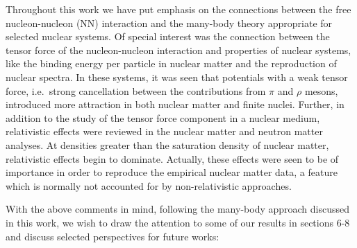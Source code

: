 
Throughout this work we have put emphasis on the connections between the
free nucleon-nucleon (NN) interaction and the many-body theory
appropriate for selected nuclear systems.
Of special interest was the
connection between the tensor force of the nucleon-nucleon interaction
and properties of nuclear systems, like the binding energy per particle
in nuclear matter and
the reproduction of
nuclear spectra. In these systems, it was seen that potentials
with a weak tensor force, i.e.\ strong cancellation between the
contributions from $\pi$ and $\rho$ mesons, introduced more attraction
in both nuclear matter and finite nuclei.
Further, in addition to the study of the tensor force component in a nuclear
medium, relativistic effects were reviewed in the nuclear matter and neutron
matter analyses. At densities greater than the saturation density of
nuclear matter, relativistic effects begin to dominate.
Actually, these effects were seen to
be of importance in order to reproduce the empirical nuclear matter data,
a feature which is normally not accounted for by non-relativistic approaches.



With the above comments  in mind, following the many-body approach
discussed in this work, we wish to draw the attention to some of our
results in sections 6-8 and discuss
selected perspectives
for future works:

